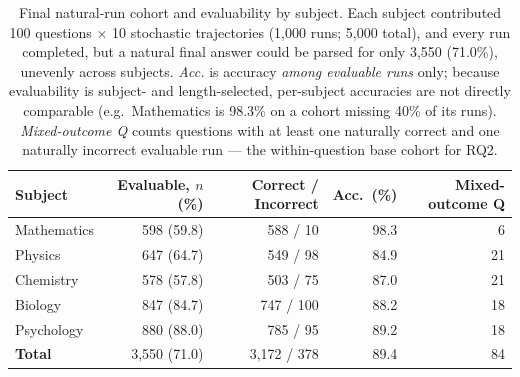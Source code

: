 \begin{table}[t]\centering
\begin{tabular}{lrrr r}
\toprule
Subject & Evaluable, $n$ (\%) & Correct / Incorrect & Acc.\ (\%) & Mixed-outcome Q \\
\midrule
Mathematics & 598 (59.8) & 588 / 10 & 98.3 & 6 \\
Physics & 647 (64.7) & 549 / 98 & 84.9 & 21 \\
Chemistry & 578 (57.8) & 503 / 75 & 87.0 & 21 \\
Biology & 847 (84.7) & 747 / 100 & 88.2 & 18 \\
Psychology & 880 (88.0) & 785 / 95 & 89.2 & 18 \\
\midrule \textbf{Total} & 3,550 (71.0) & 3,172 / 378 & 89.4 & 84 \\
\bottomrule
\end{tabular}
\caption{Final natural-run cohort and evaluability by subject. Each subject contributed 100 questions $\times$ 10 stochastic trajectories (1{,}000 runs; 5{,}000 total), and every run completed, but a natural final answer could be parsed for only 3{,}550 (71.0\%), unevenly across subjects. \emph{Acc.} is accuracy \emph{among evaluable runs} only; because evaluability is subject- and length-selected, per-subject accuracies are not directly comparable (e.g.\ Mathematics is 98.3\% on a cohort missing 40\% of its runs). \emph{Mixed-outcome Q} counts questions with at least one naturally correct and one naturally incorrect evaluable run --- the within-question base cohort for RQ2.}
\label{tab:cohort}
\end{table}
